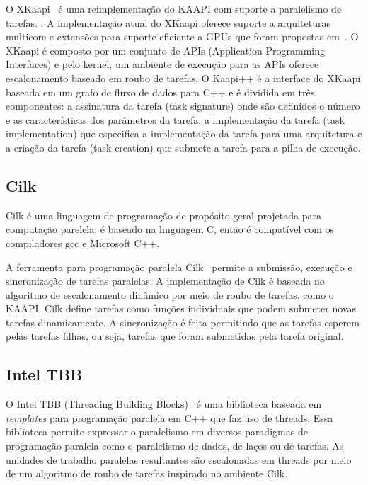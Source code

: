 O XKaapi~\citep{gautier:hal-00799904} é uma reimplementação do KAAPI com suporte a paralelismo de tarefas. . A implementação atual do XKaapi oferece suporte a arquiteturas multicore e extensões para suporte eficiente a GPUs que foram propostas em~\citep{hermann:inria-00502448, lima2012exploiting}. O XKaapi é composto por um conjunto de APIs (Application Programming Interfaces) e pelo kernel, um ambiente de execução para as APIs oferece escalonamento baseado em roubo de tarefas. O Kaapi++ é a interface do XKaapi baseada em um grafo de fluxo de dados para C++ e é dividida em três componentes: a assinatura da tarefa (task signature) onde são definidos o número e as características dos parâmetros da tarefa; a implementação da tarefa (task implementation) que especifica a implementação da tarefa para uma arquitetura e a criação da tarefa (task creation) que submete a tarefa para a pilha de execução.

\subsection{Cilk}

Cilk é uma linguagem de programação de propósito geral projetada para computação parelela, é baseado na linguagem C, então é compatível com os compiladores gcc e Microsoft C++.

A ferramenta para programação paralela Cilk~\citep{Blumofe:1995:CEM:209936.209958, Blumofe:1997:ARP:1268680.1268690} permite a submissão, execução e sincronização de tarefas paralelas. A implementação de Cilk é baseada no algoritmo de escalonamento dinâmico por meio de roubo de tarefas, como o KAAPI. Cilk define tarefas como funções individuais que podem submeter novas tarefas dinamicamente. A sincronização é feita permitindo que as tarefas esperem pelas tarefas filhas, ou seja, tarefas que foram submetidas pela tarefa original.


\subsection{Intel TBB}

O Intel TBB (Threading Building Blocks)~\citep{Kim:2011:MDP:1920042.1920078} é uma biblioteca baseada em \emph{templates} para programação paralela em C++ que faz uso de threads. Essa biblioteca permite expressar o paralelismo em diversos paradigmas de programação paralela como o paralelismo de dados, de laços ou de tarefas. As unidades de trabalho paralelas resultantes são escalonadas em threads por meio de um algoritmo de roubo de tarefas inspirado no ambiente Cilk.

